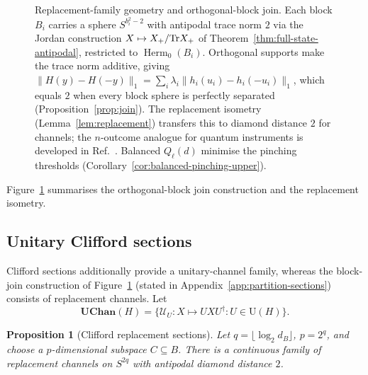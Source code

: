\documentclass[11pt,a4paper]{article}
\theoremstyle{definition}
\theoremstyle{plain}
\newtheorem{proposition}[theorem]{Proposition}
\theoremstyle{remark}
\DeclareMathOperator{\Herm}{Herm}
\newcommand{\UChan}{\mathbf{UChan}}
\begin{document}
\begin{figure}[t]
\caption{Replacement-family geometry and orthogonal-block join. Each block $B_i$ carries a sphere $S^{b_i^2-2}$ with antipodal trace norm $2$ via the Jordan construction $X\mapsto X_+/{\rm Tr}X_+$ of Theorem~\ref{thm:full-state-antipodal}, restricted to $\Herm_0(B_i)$. Orthogonal supports make the trace norm additive, giving $\|H(y)-H(-y)\|_1=\sum_i\lambda_i\|h_i(u_i)-h_i(-u_i)\|_1$, which equals $2$ when every block sphere is perfectly separated (Proposition~\ref{prop:join}). The replacement isometry (Lemma~\ref{lem:replacement}) transfers this to diamond distance $2$ for channels; the $n$-outcome analogue for quantum instruments is developed in Ref.~\cite{CompanionInstruments}. Balanced $Q_\ell(d)$ minimise the pinching thresholds (Corollary~\ref{cor:balanced-pinching-upper}).}
\label{fig:replacement-join}
\end{figure}

Figure~\ref{fig:replacement-join} summarises the orthogonal-block join construction and the replacement isometry.

\subsection{Unitary Clifford sections}

Clifford sections additionally provide a unitary-channel family, whereas the
block-join construction of Figure~\ref{fig:replacement-join} (stated in
Appendix~\ref{app:partition-sections}) consists of replacement channels. Let
\[
\UChan(H)=\{\mathcal U_U:X\mapsto UXU^\dagger:U\in\mathrm U(H)\}.
\]

\begin{proposition}[Clifford replacement sections]
\label{prop:clifford-replacement}
Let $q=\lfloor\log_2d_B\rfloor$, $p=2^q$, and choose a
$p$-dimensional subspace $C\subseteq B$. There is a continuous family of
replacement channels on $S^{2q}$ with antipodal diamond distance $2$.
\end{proposition}
\end{document}
